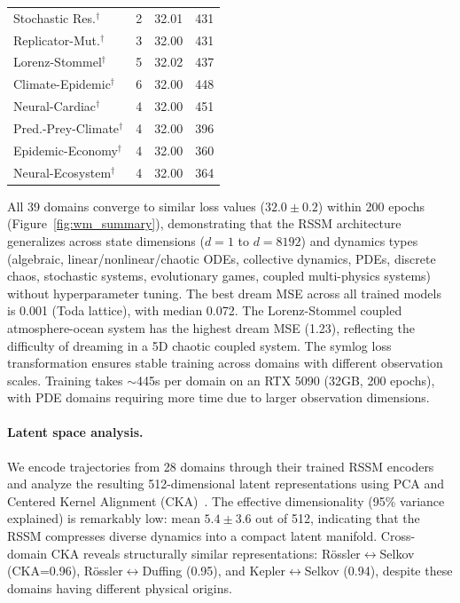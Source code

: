 \documentclass{article}
\begin{document}
\begin{table}[h]
\begin{tabular}{lccc}
Stochastic Res.$^\dagger$ & 2 & 32.01 & 431 \\
Replicator-Mut.$^\dagger$ & 3 & 32.00 & 431 \\
Lorenz-Stommel$^\dagger$ & 5 & 32.02 & 437 \\
Climate-Epidemic$^\dagger$ & 6 & 32.00 & 448 \\
Neural-Cardiac$^\dagger$ & 4 & 32.00 & 451 \\
\midrule
Pred.-Prey-Climate$^\dagger$ & 4 & 32.00 & 396 \\
Epidemic-Economy$^\dagger$ & 4 & 32.00 & 360 \\
Neural-Ecosystem$^\dagger$ & 4 & 32.00 & 364 \\
\bottomrule
\end{tabular}
\end{table}

All 39 domains converge to similar loss values ($32.0\pm0.2$) within
200 epochs (Figure~\ref{fig:wm_summary}), demonstrating that the RSSM architecture generalizes across
state dimensions ($d = 1$ to $d = 8192$) and dynamics types
(algebraic, linear/nonlinear/chaotic ODEs, collective dynamics,
PDEs, discrete chaos, stochastic systems, evolutionary games, coupled
multi-physics systems) without hyperparameter tuning. The best dream MSE
across all trained models is 0.001 (Toda lattice), with median 0.072.
The Lorenz-Stommel
coupled atmosphere-ocean system has the highest dream MSE (1.23), reflecting
the difficulty of dreaming in a 5D chaotic coupled system. The symlog loss
transformation ensures stable training across domains with different
observation scales. Training
takes $\sim$445s per domain on an RTX 5090 (32GB, 200 epochs), with PDE domains
requiring more time due to larger observation dimensions.

\paragraph{Latent space analysis.}
We encode trajectories from 28 domains through their trained RSSM encoders and
analyze the resulting 512-dimensional latent representations using PCA and
Centered Kernel Alignment (CKA)~\cite{kornblith2019similarity}. The effective
dimensionality (95\% variance explained) is remarkably low: mean $5.4 \pm 3.6$
out of 512, indicating that the RSSM compresses diverse dynamics into a
compact latent manifold. Cross-domain CKA reveals structurally similar
representations: R\"ossler$\leftrightarrow$Selkov (CKA=0.96),
R\"ossler$\leftrightarrow$Duffing (0.95), and Kepler$\leftrightarrow$Selkov
(0.94), despite these domains having different physical origins.
\end{document}
